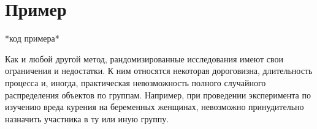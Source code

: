     \section{Пример}

    *код примера*


    Как и любой другой метод, рандомизированные исследования имеют свои ограничения и недостатки.
    К ним относятся некоторая дороговизна, длительность процесса и, иногда, практическая невозможность полного случайного распределения объектов по группам.
    Например, при проведении эксперимента по изучению вреда курения на беременных женщинах, невозможно принудительно назначить участника в ту или иную группу.


